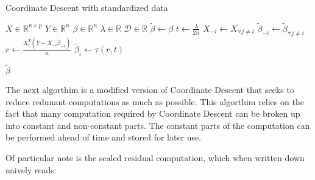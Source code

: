 \documentclass[letterpaper,11pt]{article}
\begin{document}
\FloatBarrier
\begin{algorithm}[!htbp]
  \caption{Coordinate Descent with standardized data}
  \begin{algorithmic}[1]
  \Statex
  \Input{}
  \Statex $X \in \mathbb{R}^{n \times p} $ 
  \Statex $Y \in \mathbb{R}^n$  
  \Statex $\beta \in \mathbb{R}^n$  
  \Statex $\lambda \in \mathbb{R}$  
  \Statex $\mathcal{D} \in \mathbb{R}$  
    \State $\widetilde{\beta} \gets \beta$ 
      \Do
          \State $t \gets \frac{ \lambda }{ 2 n }$ 
          \State $X_{-i} \gets X_{ \forall j \neq i}$ 
          \State $\widetilde{\beta}_{-i} \gets \widetilde{\beta}_{ \forall j \neq i}$ 
          \State $r \gets \frac{ X_i^T\left( Y - X_{-i} \widetilde{\beta}_{-i}\right) }{ n }$ 
          \State $\widetilde{\beta}_i \gets \tau \left( r, t \right)$ 
        \EndFor
      \\
  \end{algorithmic}
  \Return $\widetilde{\beta}$
\end{algorithm}
\FloatBarrier

The next algorthim is a modified version of Coordinate Descent that seeks to reduce
redunant computations as much as possible.
This algorthim relies on the fact that many computation required by
Coordinate Descent can be broken up into constant and non-constant parts. The
constant parts of the computation can be performed ahead of time and stored for later use.

Of particular note is the scaled residual computation, which when written down naively reads:
\end{document}
